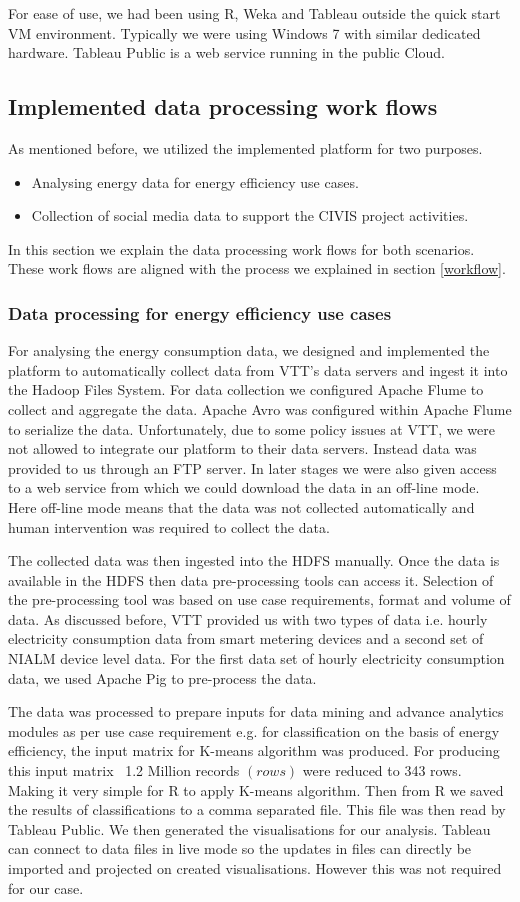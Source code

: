 For ease of use, we had been using R, Weka and Tableau outside the quick start VM environment. Typically we were using Windows 7 with similar dedicated hardware. Tableau Public is a web service running in the public Cloud.
\subsection{Implemented data processing work flows } 
As mentioned before, we utilized the implemented platform for two purposes.
\begin{itemize}
\item Analysing energy data for energy efficiency use cases.
\item Collection of social media data to support the CIVIS project activities. 
\end{itemize}
In this section we explain the data processing work flows for both scenarios. These work flows are aligned with the process we explained in section \ref{workflow}. 
\subsubsection{Data processing for energy efficiency use cases}
For analysing the energy consumption data, we designed and implemented the platform to automatically collect data from VTT's data servers and ingest it into the Hadoop Files System. For data collection we configured Apache Flume to collect and aggregate the data. Apache Avro was configured within Apache Flume to serialize the data. Unfortunately, due to some policy issues at VTT, we were not allowed to integrate our platform to their data servers. Instead data was provided to us through an FTP server. In later stages we were also given access to a web service from which we could download the data in an off-line mode. Here off-line mode means that the data was not collected automatically and human intervention was required to collect the data.

The collected data was then ingested into the HDFS manually. Once the data is available in the HDFS then data pre-processing tools can access it. Selection of the pre-processing tool was based on use case requirements, format and volume of data. As discussed before, VTT provided us with two types of data i.e. hourly electricity consumption data from smart metering devices and a second set of NIALM device level data. For the first data set of hourly electricity consumption data, we used Apache Pig to pre-process the data. 

 The data was processed to prepare inputs for data mining and advance analytics modules as per use case requirement e.g. for classification on the basis of energy efficiency, the input matrix for K-means algorithm was produced. For producing this input matrix ~1.2 Million records \((rows)\) were reduced to 343 rows. Making it very simple for R to apply K-means algorithm. Then from R we saved the results of classifications to a comma separated file. This file was then read by Tableau Public. We then generated the visualisations for our analysis. Tableau can connect to data files in live mode so the updates in files can directly be imported and projected on created visualisations. However this was not required for our case.
 
